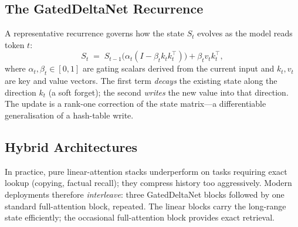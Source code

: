 \documentclass[11pt,a4paper]{article}
\theoremstyle{definition}
\theoremstyle{remark}
\theoremstyle{plain}
\begin{document}
\subsection{The GatedDeltaNet Recurrence}

A representative recurrence governs how the state $S_t$ evolves as the
model reads token $t$:
\begin{equation}
  S_t \;=\; S_{t-1}\bigl(\alpha_t (I - \beta_t k_t k_t^\top)\bigr) + \beta_t v_t k_t^\top,
  \label{eq:gdn}
\end{equation}
where $\alpha_t, \beta_t \in [0,1]$ are gating scalars derived from the
current input and $k_t, v_t$ are key and value vectors. The first term
\emph{decays} the existing state along the direction $k_t$ (a soft
forget); the second \emph{writes} the new value into that direction. The
update is a rank-one correction of the state matrix---a differentiable
generalisation of a hash-table write.

\subsection{Hybrid Architectures}

In practice, pure linear-attention stacks underperform on tasks requiring
exact lookup (copying, factual recall); they compress history too
aggressively. Modern deployments therefore \emph{interleave}: three
GatedDeltaNet blocks followed by one standard full-attention block,
repeated. The linear blocks carry the long-range state efficiently; the
occasional full-attention block provides exact retrieval.

\begin{center}
\end{center}
\end{document}
